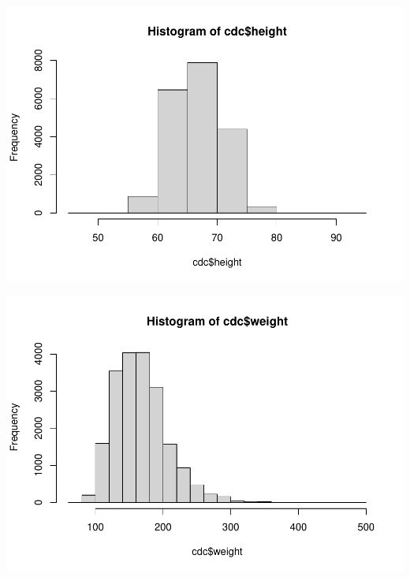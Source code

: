 \documentclass[
]{book}
\newenvironment{Shaded}{\begin{snugshade}}{\end{snugshade}}
\newcommand{\KeywordTok}[1]{\textcolor[rgb]{0.13,0.29,0.53}{\textbf{#1}}}
\newcommand{\NormalTok}[1]{#1}
\newcommand{\OperatorTok}[1]{\textcolor[rgb]{0.81,0.36,0.00}{\textbf{#1}}}
\begin{document}
\includegraphics{_main_files/figure-latex/unnamed-chunk-123-1.pdf}

\begin{Shaded}
\end{Shaded}

\includegraphics{_main_files/figure-latex/unnamed-chunk-123-2.pdf}

\begin{Shaded}
\end{Shaded}
\end{document}

